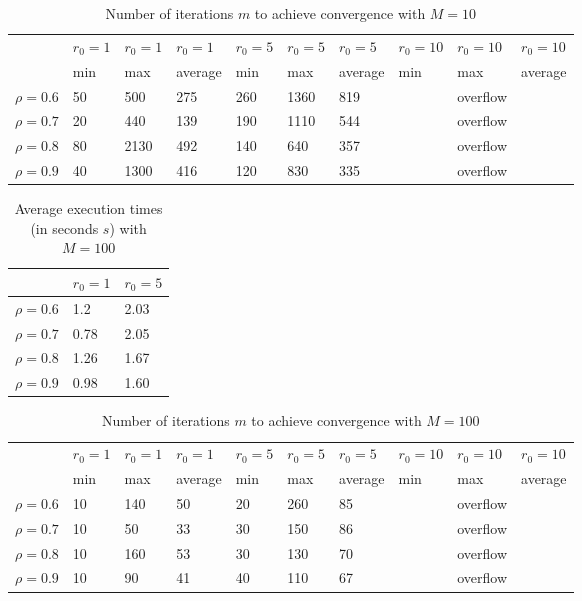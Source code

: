 \documentclass[a4paper,11pt,openright]{report}
\begin{document}
\begin{table}[H]
\centering
\addtolength{\leftskip}{-1.5cm}
\addtolength{\rightskip}{-1.5cm}
\begin{tabular}{|c|lllllllll|}
\hline
$ $ & $r_0 = 1$ & $r_0 = 1$ & $r_0 = 1$ & $r_0 = 5$ & $r_0 = 5$ & $r_0 = 5$ & $r_0 = 10$ & $r_0 = 10$ & $r_0 = 10$  \\
$ $ & min & max & average & min & max & average & min & max & average \\ 
\hline
$\rho = 0.6$ & 50 & 500 & 275 & 260 & 1360 & 819 &  & overflow &  \\

$\rho = 0.7$ & 20 & 440 & 139 & 190 & 1110 & 544 &  & overflow &  \\

$\rho = 0.8$ & 80 & 2130 & 492 & 140 & 640 & 357 &  & overflow & \\

$\rho = 0.9$ & 40 & 1300 & 416 & 120 & 830 & 335 &  & overflow & \\
\hline
\end{tabular}
\caption{Number of iterations $m$ to achieve convergence with $M = 10$}
\end{table}
\begin{table}[H]
\centering
\addtolength{\leftskip}{-1.5cm}
\addtolength{\rightskip}{-1.5cm}
\begin{tabular}{|c|ll|}
\hline
$ $ & $r_0 = 1$ & $r_0 = 5$ \\
\hline
$\rho = 0.6$ & 1.2 & 2.03 \\

$\rho = 0.7$ & 0.78 & 2.05 \\

$\rho = 0.8$ & 1.26 & 1.67  \\

$\rho = 0.9$ & 0.98 & 1.60 \\
\hline
\end{tabular}
\caption{Average execution
 times (in seconds $s$) with $M = 100$}
\end{table}
\begin{table}[H]
\centering
\addtolength{\leftskip}{-1.5cm}
\addtolength{\rightskip}{-1.5cm}
\begin{tabular}{|c|lllllllll|}
\hline
$ $ & $r_0 = 1$ & $r_0 = 1$ & $r_0 = 1$ & $r_0 = 5$ & $r_0 = 5$ & $r_0 = 5$ & $r_0 = 10$ & $r_0 = 10$ & $r_0 = 10$  \\
$ $ & min & max & average & min & max & average & min & max & average \\ 
\hline
$\rho = 0.6$ & 10 & 140 & 50 & 20 & 260 & 85 &  & overflow &  \\

$\rho = 0.7$ & 10 & 50 & 33 & 30 & 150 & 86 &  & overflow &  \\

$\rho = 0.8$ & 10 & 160 & 53 & 30 & 130 & 70 &  & overflow & \\

$\rho = 0.9$ & 10 & 90 & 41 & 40 & 110 & 67 &  & overflow & \\
\hline
\end{tabular}
\caption{Number of iterations $m$ to achieve convergence with $M = 100$}
\end{table}
\end{document}
